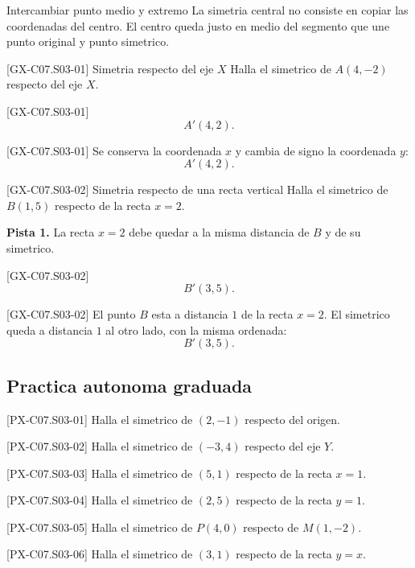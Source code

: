 \begin{commonerror}{Intercambiar punto medio y extremo}
La simetria central no consiste en copiar las coordenadas del centro. El centro queda justo en
medio del segmento que une punto original y punto simetrico.
\end{commonerror}

\begin{guidedexercise}{[GX-C07.S03-01] Simetria respecto del eje \(X\)}
Halla el simetrico de \(A(4,-2)\) respecto del eje \(X\).
\end{guidedexercise}

\begin{shortanswer}{[GX-C07.S03-01]}
\[
A'(4,2).
\]
\end{shortanswer}

\begin{fullsolution}{[GX-C07.S03-01]}
Se conserva la coordenada \(x\) y cambia de signo la coordenada \(y\):
\[
A'(4,2).
\]
\end{fullsolution}

\begin{guidedexercise}{[GX-C07.S03-02] Simetria respecto de una recta vertical}
Halla el simetrico de \(B(1,5)\) respecto de la recta \(x=2\).

\textbf{Pista 1.} La recta \(x=2\) debe quedar a la misma distancia de \(B\) y de su simetrico.
\end{guidedexercise}

\begin{shortanswer}{[GX-C07.S03-02]}
\[
B'(3,5).
\]
\end{shortanswer}

\begin{fullsolution}{[GX-C07.S03-02]}
El punto \(B\) esta a distancia \(1\) de la recta \(x=2\). El simetrico queda a distancia \(1\)
al otro lado, con la misma ordenada:
\[
B'(3,5).
\]
\end{fullsolution}

\subsection*{Practica autonoma graduada}
\begin{exercise}{[PX-C07.S03-01] Halla el simetrico de \((2,-1)\) respecto del origen.}
\end{exercise}
\begin{exercise}{[PX-C07.S03-02] Halla el simetrico de \((-3,4)\) respecto del eje \(Y\).}
\end{exercise}
\begin{exercise}{[PX-C07.S03-03] Halla el simetrico de \((5,1)\) respecto de la recta \(x=1\).}
\end{exercise}
\begin{exercise}{[PX-C07.S03-04] Halla el simetrico de \((2,5)\) respecto de la recta \(y=1\).}
\end{exercise}
\begin{exercise}{[PX-C07.S03-05] Halla el simetrico de \(P(4,0)\) respecto de \(M(1,-2)\).}
\end{exercise}
\begin{exercise}{[PX-C07.S03-06] Halla el simetrico de \((3,1)\) respecto de la recta \(y=x\).}
\end{exercise}

